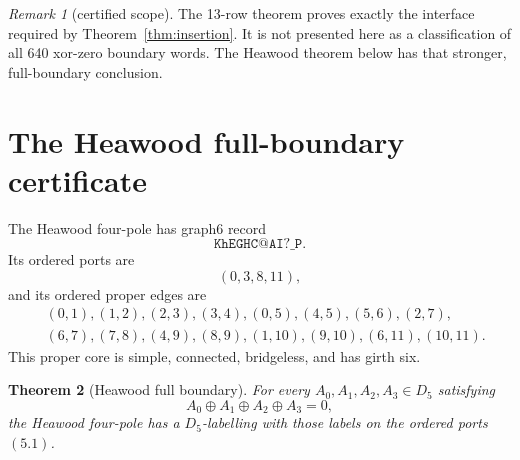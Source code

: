 \documentclass[11pt]{article}
\newtheorem{theorem}{Theorem}[section]
\theoremstyle{definition}
\theoremstyle{remark}
\newtheorem{remark}[theorem]{Remark}
\newcommand{\xor}{\mathbin{\oplus}}
\newcommand{\Dfive}{D_5}
\begin{document}
\begin{remark}[certified scope]
The 13-row theorem proves exactly the interface required by
Theorem~\ref{thm:insertion}.  It is not presented here as a classification
of all 640 xor-zero boundary words.  The Heawood theorem below has that
stronger, full-boundary conclusion.
\end{remark}

\section{The Heawood full-boundary certificate}\label{sec:heawood}

The Heawood four-pole has graph6 record
\[
                         \texttt{KhEGHC@AI?\_P}.
\]
Its ordered ports are
\[
                         (0,3,8,11),                       \tag{5.1}
\]
and its ordered proper edges are
\[
\begin{aligned}
 &(0,1),(1,2),(2,3),(3,4),(0,5),(4,5),(5,6),(2,7),\\
 &(6,7),(7,8),(4,9),(8,9),(1,10),(9,10),(6,11),(10,11).
\end{aligned}                                             \tag{5.2}
\]
This proper core is simple, connected, bridgeless, and has girth six.

\begin{theorem}[Heawood full boundary]\label{thm:heawood}
For every \(A_0,A_1,A_2,A_3\in\Dfive\) satisfying
\[
                         A_0\xor A_1\xor A_2\xor A_3=0,
\]
the Heawood four-pole has a \(\Dfive\)-labelling with those labels on the
ordered ports \((5.1)\).
\end{theorem}
\end{document}
